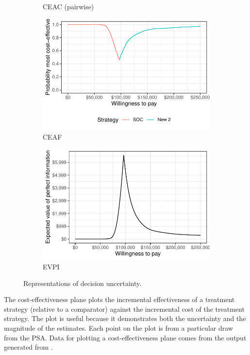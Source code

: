 \documentclass[article, nojss]{jss}\usepackage[]{graphicx}\usepackage[]{color}
\begin{document}
\begin{figure}[t!]
\begin{subfigure}[b]{.49\textwidth}
\caption{CEAC (pairwise)} \label{subfig:ceac-pw}
\end{subfigure}
\begin{subfigure}[b]{.49\textwidth}
\centering
\includegraphics{figure/ceaf-1.pdf}
\caption{CEAF} \label{subfig:ceaf}
\end{subfigure}
\par\bigskip %
\begin{subfigure}[b]{.49\textwidth}
\centering
\includegraphics{figure/evpi-1.pdf}
\caption{EVPI} \label{subfig:evpi}
\end{subfigure}
\caption{Representations of decision uncertainty.}\label{fig:cea-plots}
\end{figure}

The cost-effectiveness plane plots the incremental effectiveness of a treatment strategy (relative to a comparator) against the incremental cost of the treatment strategy. The plot is useful because it demonstrates both the uncertainty and the magnitude of the estimates. Each point on the plot is from a particular draw from the PSA. Data for plotting a cost-effectiveness plane comes from the  output generated from .
\end{document}

